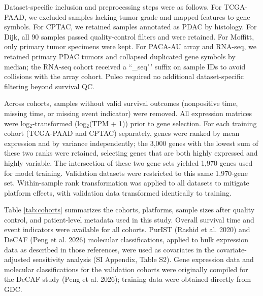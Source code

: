 \documentclass[
]{article}
\begin{document}
Dataset-specific inclusion and preprocessing steps were as follows. For
TCGA-PAAD, we excluded samples lacking tumor grade and mapped features
to gene symbols. For CPTAC, we retained samples annotated as PDAC by
histology. For Dijk, all 90 samples passed quality-control filters and
were retained. For Moffitt, only primary tumor specimens were kept. For
PACA-AU array and RNA-seq, we retained primary PDAC tumors and collapsed
duplicated gene symbols by median; the RNA-seq cohort received a
``\_seq'\,' suffix on sample IDs to avoid collisions with the array
cohort. Puleo required no additional dataset-specific filtering beyond
survival QC.

Across cohorts, samples without valid survival outcomes (nonpositive
time, missing time, or missing event indicator) were removed. All
expression matrices were log\(_2\)-transformed (log\(_2\)(TPM + 1))
prior to gene selection. For each training cohort (TCGA-PAAD and CPTAC)
separately, genes were ranked by mean expression and by variance
independently; the 3,000 genes with the lowest sum of these two ranks
were retained, selecting genes that are both highly expressed and highly
variable. The intersection of these two gene sets yielded 1,970 genes
used for model training. Validation datasets were restricted to this
same 1,970-gene set. Within-sample rank transformation was applied to
all datasets to mitigate platform effects, with validation data
transformed identically to training.

Table \ref{tab:cohorts} summarizes the cohorts, platforms, sample sizes
after quality control, and patient-level metadata used in this study.
Overall survival time and event indicators were available for all
cohorts. PurIST (Rashid et al. 2020) and DeCAF (Peng et al. 2026)
molecular classifications, applied to bulk expression data as described
in those references, were used as covariates in the covariate-adjusted
sensitivity analysis (SI Appendix, Table S2). Gene expression data and
molecular classifications for the validation cohorts were originally
compiled for the DeCAF study (Peng et al. 2026); training data were
obtained directly from GDC.
\end{document}
